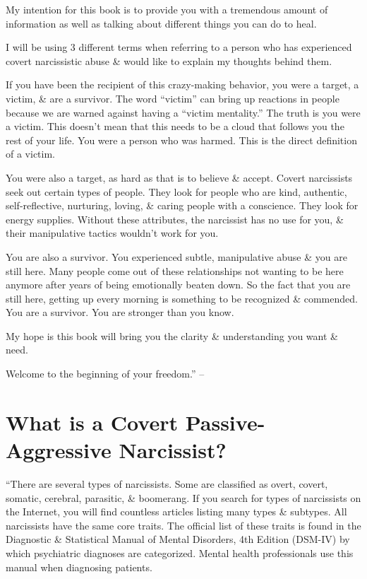 \documentclass{article}
\numberwithin{equation}{section}
\begin{document}
My intention for this book is to provide you with a tremendous amount of information as well as talking about different things you can do to heal.

I will be using 3 different terms when referring to a person who has experienced covert narcissistic abuse \& would like to explain my thoughts behind them.

If you have been the recipient of this crazy-making behavior, you were a target, a victim, \& are a survivor. The word ``victim'' can bring up reactions in people because we are warned against having a ``victim mentality.'' The truth is you were a victim. This doesn't mean that this needs to be a cloud that follows you the rest of your life. You were a person who was harmed. This is the direct definition of a victim. 

You were also a target, as hard as that is to believe \& accept. Covert narcissists seek out certain types of people. They look for people who are kind, authentic, self-reflective, nurturing, loving, \& caring people with a conscience. They look for energy supplies. Without these attributes, the narcissist has no use for you, \& their manipulative tactics wouldn't work for you.

You are also a survivor. You experienced subtle, manipulative abuse \& you are still here. Many people come out of these relationships not wanting to be here anymore after years of being emotionally beaten down. So the fact that you are still here, getting up every morning is something to be recognized \& commended. You are a survivor. You are stronger than you know.

My hope is this book will bring you the clarity \& understanding you want \& need.

Welcome to the beginning of your freedom.'' -- \cite[pp. 13--23]{Mirza2017}


\section{What is a Covert Passive-Aggressive Narcissist?}
``There are several types of narcissists. Some are classified as overt, covert, somatic, cerebral, parasitic, \& boomerang. If you search for types of narcissists on the Internet, you will find countless articles listing many types \& subtypes. All narcissists have the same core traits. The official list of these traits is found in the Diagnostic \& Statistical Manual of Mental Disorders, 4th Edition (DSM-IV) by which psychiatric diagnoses are categorized. Mental health professionals use this manual when diagnosing patients.
\end{document}
